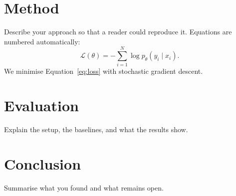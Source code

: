 \section{Method}
\label{sec:method}

Describe your approach so that a reader could reproduce it. Equations are
numbered automatically:
\begin{equation}
  \mathcal{L}(\theta) = -\sum_{i=1}^{N} \log p_\theta(y_i \mid x_i).
  \label{eq:loss}
\end{equation}
We minimise Equation~\eqref{eq:loss} with stochastic gradient descent.

\section{Evaluation}
\label{sec:eval}

Explain the setup, the baselines, and what the results show.

\section{Conclusion}

Summarise what you found and what remains open.
